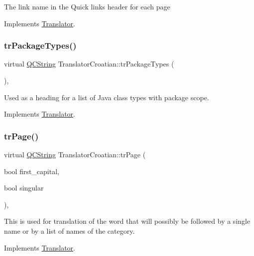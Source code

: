 The link name in the Quick links header for each page 

Implements \mbox{\hyperlink{class_translator}{Translator}}.

\mbox{\label{class_translator_croatian_a4ce8a6d0ef5cc97fc5df8527e7aa4a3b}} 
\subsubsection{\texorpdfstring{trPackageTypes()}{trPackageTypes()}}
{\footnotesize\ttfamily virtual \mbox{\hyperlink{class_q_c_string}{Q\+C\+String}} Translator\+Croatian\+::tr\+Package\+Types (\begin{DoxyParamCaption}{ }\end{DoxyParamCaption})\hspace{0.3cm}{\ttfamily [inline]}, {\ttfamily [virtual]}}

Used as a heading for a list of Java class types with package scope. 

Implements \mbox{\hyperlink{class_translator}{Translator}}.

\mbox{\label{class_translator_croatian_ae4121bb290db310efb73193303ae09b3}} 
\subsubsection{\texorpdfstring{trPage()}{trPage()}}
{\footnotesize\ttfamily virtual \mbox{\hyperlink{class_q_c_string}{Q\+C\+String}} Translator\+Croatian\+::tr\+Page (\begin{DoxyParamCaption}\item[{bool}]{first\+\_\+capital,  }\item[{bool}]{singular }\end{DoxyParamCaption})\hspace{0.3cm}{\ttfamily [inline]}, {\ttfamily [virtual]}}

This is used for translation of the word that will possibly be followed by a single name or by a list of names of the category. 

Implements \mbox{\hyperlink{class_translator}{Translator}}.

